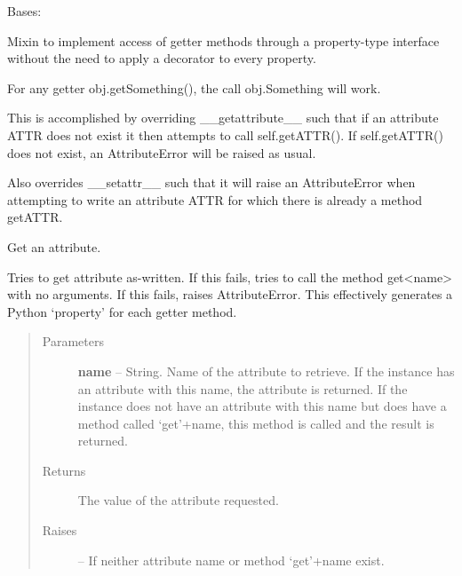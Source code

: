 \documentclass[letterpaper,10pt,english]{sphinxmanual}
\begin{document}
\begin{fulllineitems}
\label{eqtools:eqtools.core.PropertyAccessMixin}
Bases: 

Mixin to implement access of getter methods through a property-type
interface without the need to apply a decorator to every property.

For any getter obj.getSomething(), the call obj.Something will work.

This is accomplished by overriding \_\_getattribute\_\_ such that if an
attribute ATTR does not exist it then attempts to call self.getATTR(). If
self.getATTR() does not exist, an AttributeError will be raised as usual.

Also overrides \_\_setattr\_\_ such that it will raise an AttributeError when
attempting to write an attribute ATTR for which there is already a method
getATTR.

\begin{fulllineitems}
\label{eqtools:eqtools.core.PropertyAccessMixin.__getattribute__}
Get an attribute.

Tries to get attribute as-written. If this fails, tries to call the
method get\textless{}name\textgreater{} with no arguments. If this fails, raises
AttributeError. This effectively generates a Python `property' for
each getter method.
\begin{quote}\begin{description}
\item[{Parameters }] \leavevmode
\textbf{name} --
String. Name of the attribute to retrieve. If the instance
has an attribute with this name, the attribute is returned. If
the instance does not have an attribute with this name but does
have a method called `get'+name, this method is called and the
result is returned.

\item[{Returns}] \leavevmode
The value of the attribute requested.

\item[{Raises }] \leavevmode
{} -- 
If neither attribute name or method `get'+name exist.

\end{description}\end{quote}

\end{fulllineitems}


\end{fulllineitems}
\end{document}
